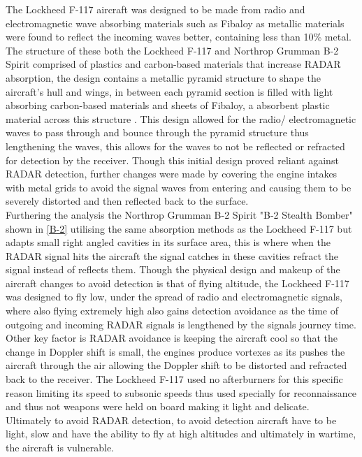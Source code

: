 \documentclass[12pt]{article}
\begin{document}
The Lockheed F-117 aircraft was designed to be made from radio and electromagnetic wave absorbing materials such as Fibaloy \cite{Ency} as metallic materials were found to reflect the incoming waves better, containing less than 10\% metal. The structure of these both the Lockheed F-117 and Northrop Grumman B-2 Spirit comprised of plastics and carbon-based materials that increase RADAR absorption, the design contains a metallic pyramid structure to shape the aircraft's hull and wings, in between each pyramid section is filled with light absorbing carbon-based materials and sheets of Fibaloy, a absorbent plastic material across this structure \cite{Ency}. This design allowed for the radio/ electromagnetic waves to pass through and bounce through the pyramid structure thus lengthening the waves, this allows for the waves to not be reflected or refracted for detection by the receiver. Though this initial design proved reliant against RADAR detection, further changes were made by covering the engine intakes with metal grids to avoid the signal waves from entering and causing them to be severely distorted and then reflected back to the surface. \\

Furthering the analysis the Northrop Grumman B-2 Spirit "B-2 Stealth Bomber" shown in \cref{B-2} utilising the same absorption methods as the Lockheed F-117 but adapts small right angled cavities in its surface area, this is where when the RADAR signal hits the aircraft the signal catches in these cavities refract the signal instead of reflects them. Though the physical design and makeup of the aircraft changes to avoid detection is that of flying altitude, the Lockheed F-117 was designed to fly low, under the spread of radio and electromagnetic signals, where also flying extremely high also gains detection avoidance as the time of outgoing and incoming RADAR signals is lengthened by the signals journey time. Other key factor is RADAR avoidance is keeping the aircraft cool so that the change in Doppler shift is small, the engines produce vortexes as its pushes the aircraft through the air allowing the Doppler shift to be distorted and refracted back to the receiver. The Lockheed F-117 used no afterburners for this specific reason limiting its speed to subsonic speeds thus used specially for reconnaissance and thus not weapons were held on board making it light and delicate. Ultimately to avoid RADAR detection, to avoid detection aircraft have to be light, slow and have the ability to fly at high altitudes and ultimately in wartime, the aircraft is vulnerable.\\
\end{document}
